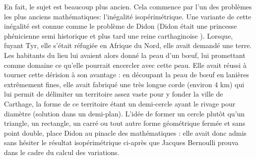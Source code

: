 \documentclass[10pt,a4paper]{article}%
\theoremstyle{theorem}
\theoremstyle{definition}
\begin{document}
	En fait, le sujet est beaucoup plus ancien. Cela commence par l'un des problèmes les plus anciens mathématiques: l'inégalité isopérimétrique. Une variante de cette inégalité est connue comme le problème de Didon (Didon était une princesse phénicienne semi historique et plus tard une reine carthaginoise \cite{didon}). Lorsque, fuyant Tyr, elle s’était réfugiée en Afrique du Nord, elle avait demandé une terre. Les habitants du lieu lui avaient alors donné la peau d’un bœuf, lui promettant comme domaine ce qu’elle pourrait encercler avec cette peau. Elle avait réussi à tourner cette dérision à son avantage : en découpant la peau de bœuf en lanières extrêmement fines, elle avait fabriqué une très longue corde (environ 4 km) qui lui permit de délimiter un territoire assez vaste pour y fonder la ville de Carthage, la forme de ce territoire étant un demi-cercle ayant le rivage pour diamètre (solution dans un demi-plan).
	L'idée de former un cercle plutôt qu'un triangle, un rectangle, un carré ou tout autre forme géométrique fermée et sans point double, place Didon au pinacle des mathématiques : elle avait donc admis sans hésiter le résultat isopérimétrique ci-après que Jacques Bernoulli prouva dans le cadre du calcul des variations.
	
	
	
%	
	
	
%	
	
\end{document}
